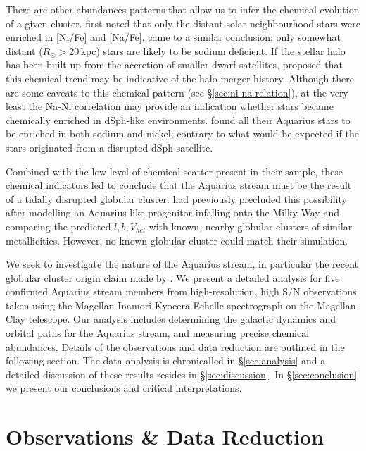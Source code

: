 \documentclass{emulateapj}
\begin{document}
There are other abundances patterns that allow us to infer the chemical evolution of a given cluster. \citet{nissen;schuster_1997} first noted that only the distant solar neighbourhood stars were enriched in [Ni/Fe] and [Na/Fe]. \citet{fulbright_2000} came to a similar conclusion: only somewhat distant ($R_\odot > 20$\,kpc) stars are likely to be sodium deficient. If the stellar halo has been built up from the accretion of smaller dwarf satellites, \citet{nissen;schuster_1997} proposed that this chemical trend may be indicative of the halo merger history. Although there are some caveats to this chemical pattern (see \S\ref{sec:ni-na-relation}), at the very least the Na-Ni correlation may provide an indication whether stars became chemically enriched in dSph-like environments. \citet{wylie-de-boer;et-al_2012} found all their Aquarius stars to be enriched in both sodium and nickel; contrary to what would be expected if the stars originated from a disrupted dSph satellite. 

Combined with the low level of chemical scatter present in their sample, these chemical indicators led \citet{wylie-de-boer;et-al_2012} to conclude that the Aquarius stream must be the result of a tidally disrupted globular cluster. \citet{williams;et-al_2011} had previously precluded this possibility after modelling an Aquarius-like progenitor infalling onto the Milky Way and comparing the predicted $l, b, V_{hel}$ with known, nearby globular clusters of similar metallicities. However, no known globular cluster could match their simulation. 

We seek to investigate the nature of the Aquarius stream, in particular the recent globular cluster origin claim made by \citet{wylie-de-boer;et-al_2012}. We present a detailed analysis for five confirmed Aquarius stream members from high-resolution, high S/N observations taken using the Magellan Inamori Kyocera Echelle spectrograph \citep{bernstein;et-al_2003} on the Magellan Clay telescope. Our analysis includes determining the galactic dynamics and orbital paths for the Aquarius stream, and measuring precise chemical abundances. Details of the observations and data reduction are outlined in the following section. The data analysis is chronicalled in \S\ref{sec:analysis} and a detailed discussion of these results resides in \S\ref{sec:discussion}. In \S\ref{sec:conclusion} we present our conclusions and critical interpretations.

\clearpage
\section{Observations \& Data Reduction}
\end{document}
